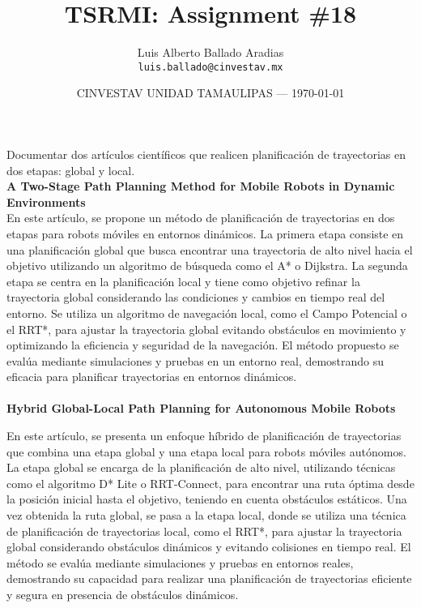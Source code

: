 \documentclass{article}
\title{TSRMI: Assignment \#18} %
\author{Luis Alberto Ballado Aradias\\ \texttt{luis.ballado@cinvestav.mx}} %
\date{CINVESTAV UNIDAD TAMAULIPAS --- \today} %
\begin{document}
\maketitle %


Documentar dos artículos científicos que realicen planificación de trayectorias en dos etapas: global y local.\\

\textbf{A Two-Stage Path Planning Method for Mobile Robots in Dynamic Environments}\\

En este artículo, se propone un método de planificación de trayectorias en dos etapas para robots móviles en entornos dinámicos. La primera etapa consiste en una planificación global que busca encontrar una trayectoria de alto nivel hacia el objetivo utilizando un algoritmo de búsqueda como el A* o Dijkstra. La segunda etapa se centra en la planificación local y tiene como objetivo refinar la trayectoria global considerando las condiciones y cambios en tiempo real del entorno. Se utiliza un algoritmo de navegación local, como el Campo Potencial o el RRT*, para ajustar la trayectoria global evitando obstáculos en movimiento y optimizando la eficiencia y seguridad de la navegación. El método propuesto se evalúa mediante simulaciones y pruebas en un entorno real, demostrando su eficacia para planificar trayectorias en entornos dinámicos.\\\\

\textbf{Hybrid Global-Local Path Planning for Autonomous Mobile Robots}

En este artículo, se presenta un enfoque híbrido de planificación de trayectorias que combina una etapa global y una etapa local para robots móviles autónomos. La etapa global se encarga de la planificación de alto nivel, utilizando técnicas como el algoritmo D* Lite o RRT-Connect, para encontrar una ruta óptima desde la posición inicial hasta el objetivo, teniendo en cuenta obstáculos estáticos. Una vez obtenida la ruta global, se pasa a la etapa local, donde se utiliza una técnica de planificación de trayectorias local, como el RRT*, para ajustar la trayectoria global considerando obstáculos dinámicos y evitando colisiones en tiempo real. El método se evalúa mediante simulaciones y pruebas en entornos reales, demostrando su capacidad para realizar una planificación de trayectorias eficiente y segura en presencia de obstáculos dinámicos.\\
\end{document}
